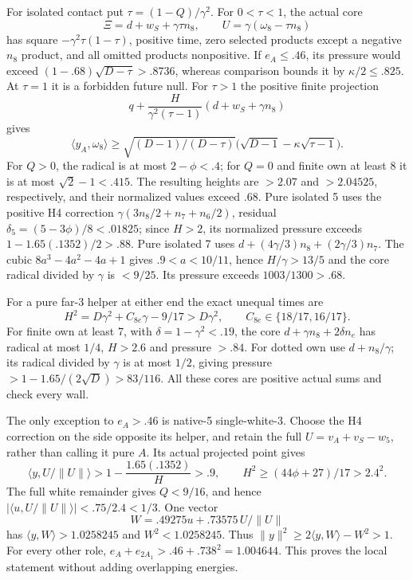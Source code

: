 \documentclass[11pt]{article}
\theoremstyle{definition}
\theoremstyle{remark}
\newcommand{\ip}[2]{\langle #1,#2\rangle}
\newcommand{\norm}[1]{\lVert #1\rVert}
\begin{document}
For isolated contact put \(\tau=(1-Q)/\gamma^2\).
For \(0<\tau<1\), the actual core
\[
 \Xi=d+w_S+\gamma\tau n_8,\qquad
 U=\gamma(\omega_8-\tau n_8)
\]
has square \(-\gamma^2\tau(1-\tau)\), positive time,
zero selected products except a negative \(n_8\) product,
and all omitted products nonpositive.
If \(e_A\le.46\), its pressure would exceed
\((1-.68)\sqrt{D-\tau}>.8736\), whereas comparison bounds
it by \(\kappa/2\le.825\).
At \(\tau=1\) it is a forbidden future null.
For \(\tau>1\) the positive finite projection
\[
 q+{\frac{H}{\gamma^2(\tau-1)}}
          (d+w_S+\gamma n_8)
\]
gives
\[
 \ip{y_A}{\omega_8}\ge
 \sqrt{(D-1)/(D-\tau)}
       \bigl(\sqrt{D-1}-\kappa\sqrt{\tau-1}\bigr).
\]
For \(Q>0\), the radical is at most \(2-\phi<.4\);
for \(Q=0\) and finite own at least 8 it is at most
\(\sqrt2-1<.415\).  The resulting heights are
\(>2.07\) and \(>2.04525\), respectively, and their normalized
values exceed \(.68\).
Pure isolated 5 uses the positive H4 correction
\(\gamma(3n_8/2+n_7+n_6/2)\), residual
\(\delta_5=(5-3\phi)/8<.01825\);
since \(H>2\), its normalized pressure exceeds
\(1-1.65(.1352)/2>.88\).
Pure isolated 7 uses \(d+(4\gamma/3)n_8+(2\gamma/3)n_7\).
The cubic \(8a^3-4a^2-4a+1\) gives
\(.9<a<10/11\), hence \(H/\gamma>13/5\) and the
core radical divided by \(\gamma\) is \(<9/25\).
Its pressure exceeds \(1003/1300>.68\).

For a pure far-3 helper at either end the exact unequal times are
\[
 H^2=D\gamma^2+C_{8e}\gamma-9/17>D\gamma^2,\qquad
 C_{8e}\in\{18/17,16/17\}.
\]
For finite own at least 7, with \(\delta=1-\gamma^2<.19\),
the core \(d+\gamma n_8+2\delta n_e\) has radical at most \(1/4\),
\(H>2.6\) and pressure \(>.84\).
For dotted own use \(d+n_8/\gamma\); its radical divided by
\(\gamma\) is at most \(1/2\), giving pressure
\(>1-1.65/(2\sqrt D)>83/116\).
All these cores are positive actual sums and check every wall.

The only exception to \(e_A>.46\) is native-5 single-white-3.
Choose the H4 correction on the side opposite its helper, and retain
the full \(U=v_A+v_S-w_5\), rather than calling it pure \(A\).
Its actual projected point gives
\[
 \ip y{U/\norm U}>
 1-{\frac{1.65(.1352)}{ H}}>.9,
 \qquad H^2\ge(44\phi+27)/17>2.4^2 .
\]
The full white remainder gives \(Q<9/16\), and hence
\(\lvert\ip u{U/\norm U}\rvert<.75/2.4<1/3\).
One vector
\[
 W=.49275u+.73575\,U/\norm U
\]
has \(\ip yW>1.0258245\) and \(W^2<1.0258245\).
Thus \(\norm y^2\ge2\ip yW-W^2>1\).
For every other role,
\(e_A+e_{2A_1}>.46+.738^2=1.004644\).
This proves the local statement without adding overlapping energies.
\end{document}
